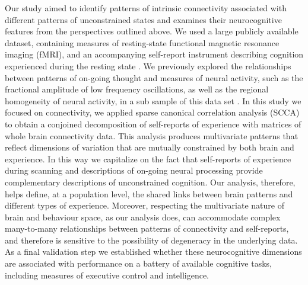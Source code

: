 Our study aimed to identify patterns of intrinsic connectivity associated with different patterns of unconstrained states and examines their neurocognitive features from the perspectives outlined above. We used a large publicly available dataset, containing measures of resting-state functional magnetic resonance imaging (fMRI), and an accompanying self-report instrument describing cognition experienced during the resting state \cite{Gorgolewski2014,Nooner2012}. We previously explored the relationships between patterns of on-going thought and measures of neural activity, such as the fractional amplitude of low frequency oscillations, as well as the regional homogeneity of neural activity, in a sub sample of this data set \cite{Gorgolewski2014}. In this study we focused on connectivity, we applied sparse canonical correlation analysis (SCCA) to obtain a conjoined decomposition of self-reports of experience with matrices of whole brain connectivity data. This analysis produces multivariate patterns that reflect dimensions of variation that are mutually constrained by both brain and experience. In this way we capitalize on the fact that self-reports of experience during scanning and descriptions of on-going neural processing provide complementary descriptions of unconstrained cognition. Our analysis, therefore, helps define, at a population level, the shared links between brain patterns and different types of experience. Moreover, respecting the multivariate nature of brain and behaviour space, as our analysis does, can accommodate complex many-to-many relationships between patterns of connectivity and self-reports, and therefore is sensitive to the possibility of degeneracy in the underlying data. As a final validation step we established whether these neurocognitive dimensions are associated with performance on a battery of available cognitive tasks, including measures of executive control and intelligence.


